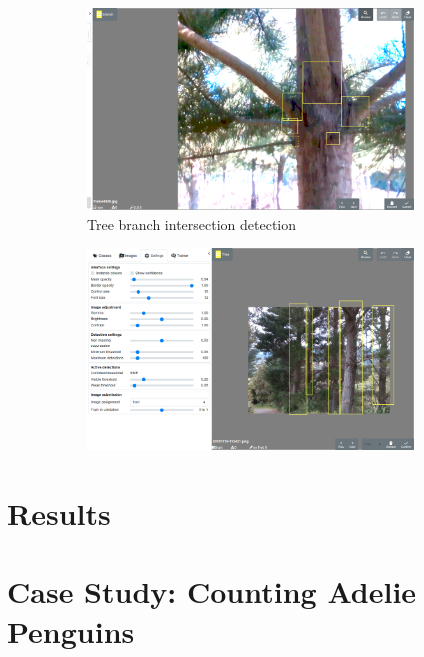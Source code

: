 \begin{figure}[h!]
\begin{subfigure}[t]{0.5\textwidth}
  \includegraphics[width=0.95\textwidth]{figures/annotation/screenshots/branches3.png}
  \caption{Tree branch intersection detection}
\end{subfigure}%
\begin{subfigure}[t]{0.5\textwidth}
  \includegraphics[width=0.95\textwidth]{figures/annotation/screenshots/josh_trees.png}
  \caption{}
\end{subfigure}

\caption{ }
\label {fig:dataset_images}
\end{figure}


\section{Results}

\section{Case Study: Counting Adelie Penguins}

